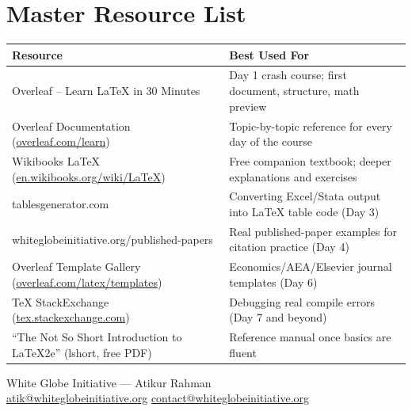 \documentclass[11pt,a4paper]{article}
\begin{document}
\newpage
\section{Master Resource List}

\begin{center}
\begin{tabular}{p{7cm}p{7.5cm}}
  \toprule
  \textbf{Resource} & \textbf{Best Used For} \\
  \midrule
  Overleaf -- Learn LaTeX in 30 Minutes & Day 1 crash course; first document, structure, math preview \\
  Overleaf Documentation (\url{overleaf.com/learn}) & Topic-by-topic reference for every day of the course \\
  Wikibooks LaTeX (\url{en.wikibooks.org/wiki/LaTeX}) & Free companion textbook; deeper explanations and exercises \\
  tablesgenerator.com & Converting Excel/Stata output into LaTeX table code (Day 3) \\
  whiteglobeinitiative.org/published-papers & Real published-paper examples for citation practice (Day 4) \\
  Overleaf Template Gallery (\url{overleaf.com/latex/templates}) & Economics/AEA/Elsevier journal templates (Day 6) \\
  TeX StackExchange (\url{tex.stackexchange.com}) & Debugging real compile errors (Day 7 and beyond) \\
  ``The Not So Short Introduction to LaTeX2e'' (lshort, free PDF) & Reference manual once basics are fluent \\
  \bottomrule
\end{tabular}
\end{center}

\vspace{20pt}
\begin{center}
\small
White Globe Initiative --- Atikur Rahman\\
\url{atik@whiteglobeinitiative.org} \quad\textbullet\quad \url{contact@whiteglobeinitiative.org}
\end{center}
\end{document}
